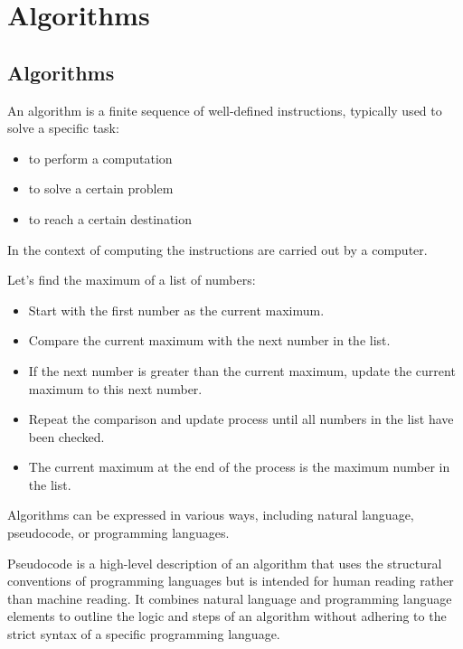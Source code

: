 \chapter{Algorithms}

\section{Algorithms}
\begin{definition}[Algorithm]
    An algorithm is a finite sequence of well-defined instructions, typically used to solve a specific task:
    \begin{itemize}[itemsep=1pt,label=$\circ$]
        \item to perform a computation
        \item to solve a certain problem
        \item to reach a certain destination
    \end{itemize}
    In the context of computing the instructions are carried out by a computer.
\end{definition}

\begin{eg}
    Let's find the maximum of a list of numbers:
    \begin{itemize}[itemsep=1pt,label=$\circ$]
        \item Start with the first number as the current maximum.
        \item Compare the current maximum with the next number in the list.
        \item If the next number is greater than the current maximum, update the current maximum to this next number.
        \item Repeat the comparison and update process until all numbers in the list have been checked.
        \item The current maximum at the end of the process is the maximum number in the list.
    \end{itemize}
\end{eg}
Algorithms can be expressed in various ways, including natural language, pseudocode, or programming languages.

\begin{definition}[Pseudocode]
    Pseudocode is a high-level description of an algorithm that uses the structural conventions of programming languages but is intended for human reading rather than machine reading. It combines natural language and programming language elements to outline the logic and steps of an algorithm without adhering to the strict syntax of a specific programming language.
\end{definition}

